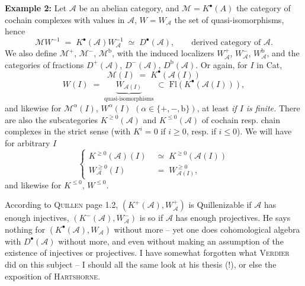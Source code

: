 \textbf{Example 2:} Let $\mathcal{A}$ be an abelian category, and $\mathcal{M} = K^{\bullet}(A)$ the category of cochain complexes with values in $\mathcal{A}$, $W = W_{\mathcal{A}}$ the set of quasi-isomorphisms, hence %
\[ \mathcal{M}W^{-1} \;=\; K^{\bullet}(\mathcal{A})W_{\mathcal{A}}^{-1} \;\simeq\; D^{\bullet}(\mathcal{A}), \qquad \text{derived category of $\mathcal{A}$.} \]
We also define $\mathcal{M}^{+}$, $\mathcal{M}^{-}$, $\mathcal{M}^{\mathrm{b}}$, with the induced localizers $W_{\mathcal{A}}^{+}$, $W_{\mathcal{A}}^{-}$, $W_{\mathcal{A}}^{\mathrm{b}}$, and the categories of fractions $D^{+}(\mathcal{A})$, $D^{-}(\mathcal{A})$, $D^{\mathrm{b}}(\mathcal{A})$. Or
again, for $I$ in Cat,
\[ \mathcal{M}(I) \;=\; K^{\bullet}(\mathcal{A}(I)) \]
\[ W(I) \;=\; \underbrace{W_{\mathcal{A}(I)}}_{\text{quasi-isomorphisms}} \;\subset\; \mathrm{Fl}(K^{\bullet}(\mathcal{A}(I))), \]
and likewise for $\mathcal{M}^{\alpha}(I)$, $W^{\alpha}(I)$ $(\alpha \in \{+,-,\mathrm{b}\})$, at least \textit{if $I$ is finite.} There are also the subcategories $K^{\geq 0}(\mathcal{A})$ and $K^{\leq 0}(\mathcal{A})$ of cochain resp. chain complexes in the strict sense (with $K^{i} = 0$ if $i \geq 0$, resp. if $i \leq 0$). We will have for arbitrary $I$
\[ \left\{ \begin{aligned} K^{\geq 0}(\mathcal{A})(I) &\;\simeq\; K^{\geq 0}(\mathcal{A}(I)) \\ W_{\mathcal{A}}^{\geq 0}(I) &\;=\; W_{\mathcal{A}(I)}^{\geq 0}, \end{aligned} \right. \]
and likewise for $K^{\leq 0}$, $W^{\leq 0}$.

According to \textsc{Quillen} page 1.2, $(K^{+}(\mathcal{A}),W_{\mathcal{A}}^{+})$ is Quillenizable if $\mathcal{A}$ has enough injectives, $(K^{-}(\mathcal{A}),W_{\mathcal{A}}^{-})$ is so if $\mathcal{A}$ has enough projectives. He says nothing for $(K^{\bullet}(\mathcal{A}),W_{\mathcal{A}})$ without more -- yet one does cohomological algebra with $D^{\bullet}(\mathcal{A})$ without more, and even without making an assumption of the existence of injectives or projectives. I have somewhat forgotten what \textsc{Verdier} did on this subject -- I should all the same look at his thesis (!), or else the exposition of \textsc{Hartshorne}.


